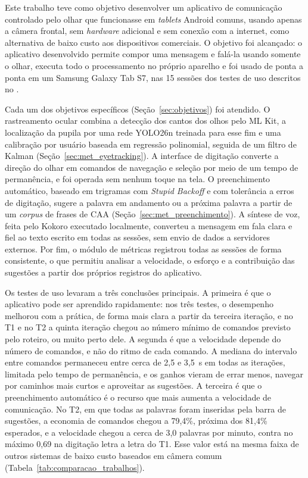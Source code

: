 Este trabalho teve como objetivo desenvolver um aplicativo de comunicação controlado pelo olhar que funcionasse em \textit{tablets} Android comuns, usando apenas a câmera frontal, sem \textit{hardware} adicional e sem conexão com a internet, como alternativa de baixo custo aos dispositivos comerciais. O objetivo foi alcançado: o aplicativo desenvolvido permite compor uma mensagem e falá-la usando somente o olhar, executa todo o processamento no próprio aparelho e foi usado de ponta a ponta em um Samsung Galaxy Tab S7, nas 15 sessões dos testes de uso descritos no .

Cada um dos objetivos específicos (Seção~\ref{sec:objetivos}) foi atendido. O rastreamento ocular combina a detecção dos cantos dos olhos pelo ML Kit, a localização da pupila por uma rede YOLO26n treinada para esse fim e uma calibração por usuário baseada em regressão polinomial, seguida de um filtro de Kalman (Seção~\ref{sec:met_eyetracking}). A interface de digitação converte a direção do olhar em comandos de navegação e seleção por meio de um tempo de permanência, e foi operada sem nenhum toque na tela. O preenchimento automático, baseado em trigramas com \textit{Stupid Backoff} e com tolerância a erros de digitação, sugere a palavra em andamento ou a próxima palavra a partir de um \textit{corpus} de frases de \gls{CAA} (Seção~\ref{sec:met_preenchimento}). A síntese de voz, feita pelo Kokoro executado localmente, converteu a mensagem em fala clara e fiel ao texto escrito em todas as sessões, sem envio de dados a servidores externos. Por fim, o módulo de métricas registrou todas as sessões de forma consistente, o que permitiu analisar a velocidade, o esforço e a contribuição das sugestões a partir dos próprios registros do aplicativo.

Os testes de uso levaram a três conclusões principais. A primeira é que o aplicativo pode ser aprendido rapidamente: nos três testes, o desempenho melhorou com a prática, de forma mais clara a partir da terceira iteração, e no T1 e no T2 a quinta iteração chegou ao número mínimo de comandos previsto pelo roteiro, ou muito perto dele. A segunda é que a velocidade depende do número de comandos, e não do ritmo de cada comando. A mediana do intervalo entre comandos permaneceu entre cerca de 2,5 e 3,5~s em todas as iterações, limitada pelo tempo de permanência, e os ganhos vieram de errar menos, navegar por caminhos mais curtos e aproveitar as sugestões. A terceira é que o preenchimento automático é o recurso que mais aumenta a velocidade de comunicação. No T2, em que todas as palavras foram inseridas pela barra de sugestões, a economia de comandos chegou a 79,4\%, próxima dos 81,4\% esperados, e a velocidade chegou a cerca de 3,0 palavras por minuto, contra no máximo 0,69 na digitação letra a letra do T1. Esse valor está na mesma faixa de outros sistemas de baixo custo baseados em câmera comum (Tabela~\ref{tab:comparacao_trabalhos}).

